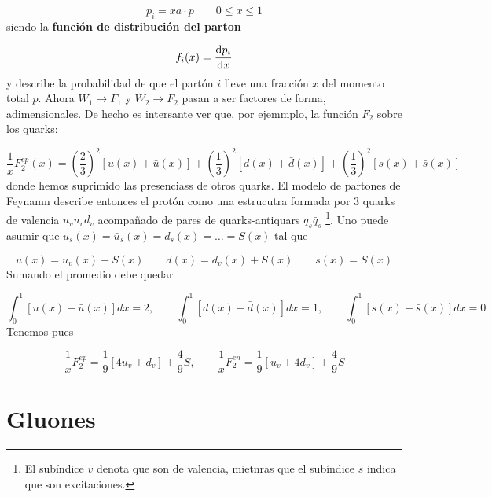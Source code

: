 \begin{equation}
	p_i = x a\cdot p \qquad 0 \leq x \leq 1
\end{equation}
siendo la \textbf{función de distribución del parton}


\begin{equation}
	f_i(x) = \frac{\mathrm{d} p_i}{\mathrm{d} x}
\end{equation}
y describe la probabilidad de que el partón $i$ lleve una fracción $x$ del momento total $p$. Ahora $W_1 \to F_1$ y $W_2 \to F_2$ pasan a ser factores de forma, adimensionales. De hecho es intersante ver que, por ejemmplo, la función $F_2$ sobre los quarks:


\begin{equation}
	\frac{1}{x} F_2^{ep}(x) = \left( \frac{2}{3} \right)^2 \left[ u(x) + \bar{u}(x) \right]
	+ \left( \frac{1}{3} \right)^2 \left[ d(x) + \bar{d}(x) \right]
	+ \left( \frac{1}{3} \right)^2 \left[ s(x) + \bar{s}(x) \right]
\end{equation}
donde hemos suprimido las presenciass de otros quarks. El modelo de partones de Feynamn describe entonces el protón como una estrucutra formada por 3 quarks de valencia $u_vu_vd_v$ acompañado de pares de quarks-antiquars $q_s\bar{q}_s$ \footnote{El subíndice $v$ denota que son de valencia, mietnras que el subíndice $s$ indica que son excitaciones.}. Uno puede asumir que $u_s(x) = \bar{u}_s(x) = d_s(x) = \ldots = S(x)$ tal que

\begin{equation}
	u(x) = u_v(x) + S(x) \qquad
	d(x) = d_v(x) + S(x) \qquad
	s(x) = S(x)
\end{equation}
Sumando el promedio debe quedar

\begin{equation}
	\int_0^1 \left[ u(x) - \bar{u}(x) \right] dx = 2, \qquad
	\int_0^1 \left[ d(x) - \bar{d}(x) \right] dx = 1, \qquad
	\int_0^1 \left[ s(x) - \bar{s}(x) \right] dx = 0
\end{equation}
Tenemos pues

\begin{equation}
	\frac{1}{x} F_2^{ep} = \frac{1}{9} \left[ 4u_v + d_v \right] + \frac{4}{9} S, \qquad \frac{1}{x} F_2^{en} = \frac{1}{9} \left[ u_v + 4d_v \right] + \frac{4}{9} S
\end{equation}

\section{Gluones}

